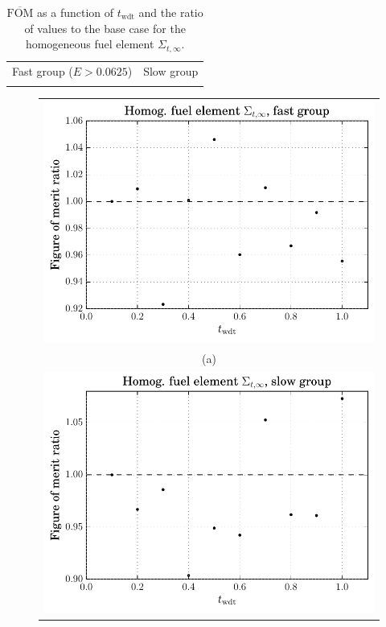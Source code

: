 \begin{table}[hbtp]
  \centering
  \caption[$\overline{\mathrm{FOM}}$ and ratio for
    the homogeneous fuel element $\Sigma_{t,\infty}$.]{$\overline{\mathrm{FOM}}$ as a function of
    $t_{\mathrm{wdt}}$ and the ratio of values to the base case for
    the homogeneous fuel element $\Sigma_{t,\infty}$.}
  \begin{tabular}{cc} Fast group ($E > 0.0625$) & Slow group \\
    
 &
   
  \end{tabular}
\label{tab:homog_inf_tot}
\end{table}
\begin{figure}[hbtp]
  \centering
  \begin{tabular}{c}
  \includegraphics[scale=0.9]{images/results/homog_inf_tot_grp_comb1} \\
    (a) \\
  \includegraphics[scale=0.9]{images/results/homog_inf_tot_grp_comb2} \\

\end{tabular}
\end{figure}
